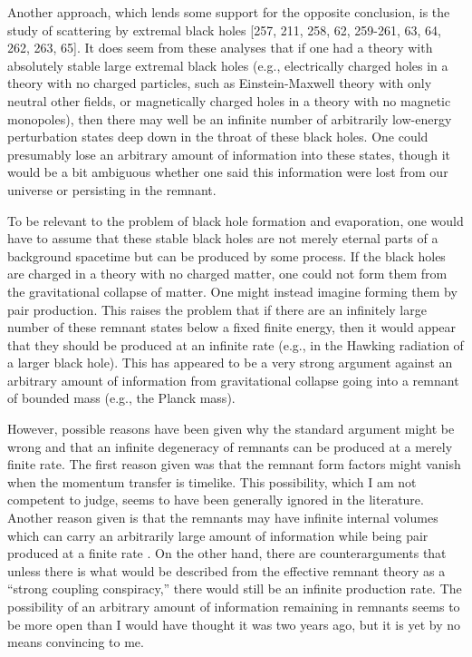 \documentclass[12pt]{article}
\begin{document}
     Another approach, which lends some support for the opposite
conclusion, is
the study of scattering by extremal black holes
[257, 211, 258, 62, 259-261, 63, 64, 262, 263, 65].
It does seem from these analyses that if one had a theory
with absolutely stable large extremal black holes
(e.g., electrically charged holes in a theory with no charged
particles,
such as Einstein-Maxwell theory with only neutral other fields, or
magnetically
charged holes in a theory with no magnetic monopoles), then there may
well be
an infinite number of arbitrarily low-energy perturbation states deep
down in
the throat of these black holes.  One could presumably lose an
arbitrary amount
of information into these states, though it would be a bit ambiguous
whether
one said this information were lost from our universe or persisting
in the
remnant.

     To be relevant to the problem of black hole formation and
evaporation, one
would have to assume that these stable black holes are not merely
eternal parts
of a background spacetime but can be produced by some process.  If
the black
holes are charged in a theory with no charged matter, one could not
form them
from the gravitational collapse of matter.  One might instead imagine
forming
them by pair production.  This raises the problem that if there are
an
infinitely large number of these remnant states below a fixed finite
energy,
then it would appear that they should be produced at an infinite rate
\cite{ACN} (e.g., in the Hawking radiation of a larger black hole).
This has
appeared to be a very strong argument against an arbitrary amount of
information from gravitational collapse going into a remnant of
bounded mass
(e.g., the Planck mass).

     However, possible reasons have been given why the standard
argument might
be wrong and that an infinite degeneracy of remnants can be produced
at a
merely finite rate.  The first reason given \cite{ACN} was that the
remnant
form factors might vanish when the momentum transfer is timelike.
This
possibility, which I am not competent to judge, seems to have been
generally
ignored in the literature.  Another reason given is that the remnants
may have
infinite internal volumes which can carry an arbitrarily large amount
of
information while being pair produced at a finite rate
\cite{BO'L,BO'LS,ST,LO'L}.
On the other hand, there are counterarguments \cite{Gid93} that
unless there
is
what would be described from the effective remnant
theory as a ``strong coupling conspiracy,'' there would still be an
infinite
production rate.  The possibility of an arbitrary amount of
information
remaining in remnants seems to be more open than I would have thought
it was
two years ago, but it is yet by no means convincing to me.
\end{document}
